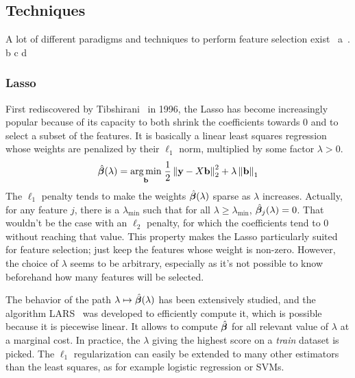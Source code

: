 \subsection{Techniques}\label{subsec:fst}

A lot of different paradigms and techniques to perform feature selection exist~\cite{intro_fs}
a~\cite{fs_text_classification}.
b\cite{gene_selection_cancer_svm}
c\cite{fs_for_classification}
d\cite{fs_for_classification_a_review}

\subsubsection{Lasso}\label{subsubsec:lasso}

First rediscovered by Tibshirani~\cite{lasso} in 1996,
the Lasso has become increasingly popular because of its capacity to both shrink
the coefficients towards 0 and to select a subset of the features.
It is basically a linear least squares regression whose weights are penalized by their $\ell_1$ norm,
multiplied by some factor $\lambda > 0$.
%
\begin{equation}\label{eq:lasso}
    \hat{\bm{\beta}}(\lambda) =
    \underset{\mathbf{b}}{\operatorname*{arg\,min}}\;
    \frac{1}{2}\left\lVert\mathbf{y} - X\mathbf{b}\right\rVert_2^2 + \lambda\left\lVert\mathbf{b}\right\rVert_1
\end{equation}
%
The $\ell_1$ penalty tends to make the weights $\hat{\bm{\beta}}(\lambda)$ sparse as $\lambda$ increases.
Actually, for any feature $j$,
there is a $\lambda_{\min}$ such that for all $\lambda \geq \lambda_{\min}$,
$\hat{\bm{\beta}}_j(\lambda) = 0$.
That wouldn't be the case with an $\ell_2$ penalty,
for which the coefficients tend to $0$ without reaching that value.
This property makes the Lasso particularly suited for feature selection;
just keep the features whose weight is non-zero.
However, the choice of $\lambda$ seems to be arbitrary,
especially as it's not possible to know beforehand how many features will be selected.

The behavior of the path $\lambda \mapsto \hat{\bm{\beta}}(\lambda)$ has been extensively studied,
and the algorithm LARS~\cite{lars} was developed to efficiently compute it,
which is possible because it is piecewise linear.
It allows to compute $\hat{\bm{\beta}}$ for all relevant value of $\lambda$ at a marginal cost.
In practice, the $\lambda$ giving the highest score on a \emph{train} dataset is picked.
The $\ell_1$ regularization can easily be extended to many other estimators than the least squares,
as for example logistic regression or SVMs.

